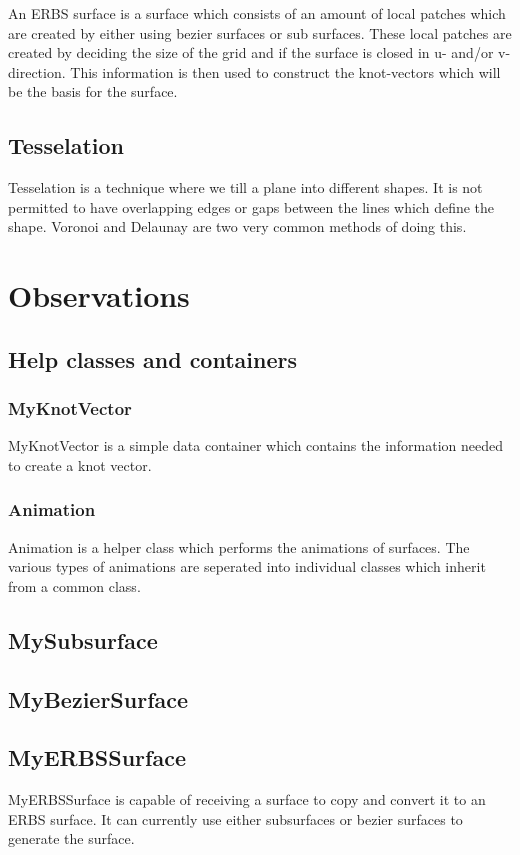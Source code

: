 \documentclass[a4paper,11pt]{article}
\begin{document}
An ERBS surface is a surface which consists of an amount of local patches which are created by either using bezier surfaces or sub surfaces. These local patches are created by deciding the size of the grid and if the surface is closed in u- and/or v-direction. This information is then used to construct the knot-vectors which will be the basis for the surface. 

\subsection{Tesselation}
Tesselation is a technique where we till a plane into different shapes. It is not permitted to have overlapping edges or gaps between the lines which define the shape. Voronoi and Delaunay are two very common methods of doing this. \\

\section{Observations}
\subsection{Help classes and containers}
\subsubsection{MyKnotVector}
MyKnotVector is a simple data container which contains the information needed to create a knot vector. 


\subsubsection{Animation}
Animation is a helper class which performs the animations of surfaces. The various types of animations are seperated into individual classes which inherit from a common class. 

\subsection{MySubsurface}
\subsection{MyBezierSurface}
\subsection{MyERBSSurface}
MyERBSSurface is capable of receiving a surface to copy and convert it to an ERBS surface. It can currently use either subsurfaces or bezier surfaces to generate the surface. 
\end{document}
